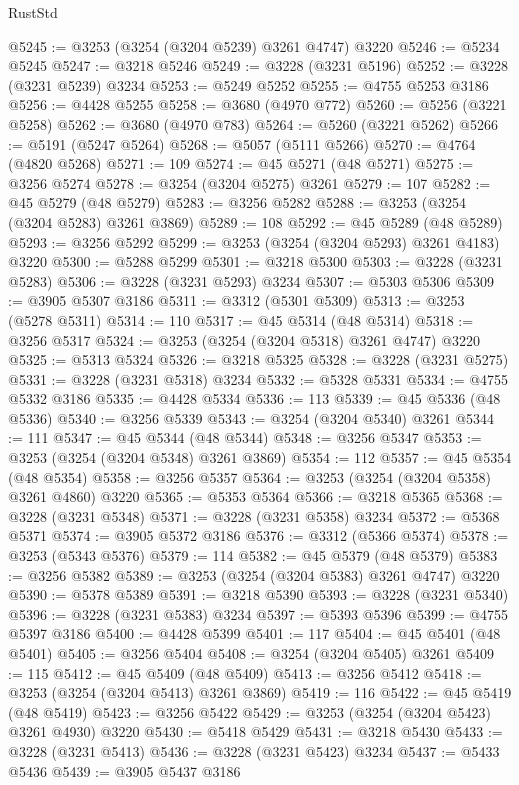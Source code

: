 \begin{lexlean}{RustStd}
\begin{coremodule}
{\begin{coremodule}
{{{{{{{{{{{{{{{{{{{{{{{{{{{{{{{{{{{{{@5245 := @3253 (@3254 (@3204 @5239) @3261 @4747) @3220
@5246 := @5234 @5245
@5247 := @3218 @5246
@5249 := @3228 (@3231 @5196)
@5252 := @3228 (@3231 @5239) @3234
@5253 := @5249 @5252
@5255 := @4755 @5253 @3186
@5256 := @4428 @5255
@5258 := @3680 (@4970 @772)
@5260 := @5256 (@3221 @5258)
@5262 := @3680 (@4970 @783)
@5264 := @5260 (@3221 @5262)
@5266 := @5191 (@5247 @5264)
@5268 := @5057 (@5111 @5266)
@5270 := @4764 (@4820 @5268)
@5271 := 109
@5274 := @45 @5271 (@48 @5271)
@5275 := @3256 @5274
@5278 := @3254 (@3204 @5275) @3261
@5279 := 107
@5282 := @45 @5279 (@48 @5279)
@5283 := @3256 @5282
@5288 := @3253 (@3254 (@3204 @5283) @3261 @3869)
@5289 := 108
@5292 := @45 @5289 (@48 @5289)
@5293 := @3256 @5292
@5299 := @3253 (@3254 (@3204 @5293) @3261 @4183) @3220
@5300 := @5288 @5299
@5301 := @3218 @5300
@5303 := @3228 (@3231 @5283)
@5306 := @3228 (@3231 @5293) @3234
@5307 := @5303 @5306
@5309 := @3905 @5307 @3186
@5311 := @3312 (@5301 @5309)
@5313 := @3253 (@5278 @5311)
@5314 := 110
@5317 := @45 @5314 (@48 @5314)
@5318 := @3256 @5317
@5324 := @3253 (@3254 (@3204 @5318) @3261 @4747) @3220
@5325 := @5313 @5324
@5326 := @3218 @5325
@5328 := @3228 (@3231 @5275)
@5331 := @3228 (@3231 @5318) @3234
@5332 := @5328 @5331
@5334 := @4755 @5332 @3186
@5335 := @4428 @5334
@5336 := 113
@5339 := @45 @5336 (@48 @5336)
@5340 := @3256 @5339
@5343 := @3254 (@3204 @5340) @3261
@5344 := 111
@5347 := @45 @5344 (@48 @5344)
@5348 := @3256 @5347
@5353 := @3253 (@3254 (@3204 @5348) @3261 @3869)
@5354 := 112
@5357 := @45 @5354 (@48 @5354)
@5358 := @3256 @5357
@5364 := @3253 (@3254 (@3204 @5358) @3261 @4860) @3220
@5365 := @5353 @5364
@5366 := @3218 @5365
@5368 := @3228 (@3231 @5348)
@5371 := @3228 (@3231 @5358) @3234
@5372 := @5368 @5371
@5374 := @3905 @5372 @3186
@5376 := @3312 (@5366 @5374)
@5378 := @3253 (@5343 @5376)
@5379 := 114
@5382 := @45 @5379 (@48 @5379)
@5383 := @3256 @5382
@5389 := @3253 (@3254 (@3204 @5383) @3261 @4747) @3220
@5390 := @5378 @5389
@5391 := @3218 @5390
@5393 := @3228 (@3231 @5340)
@5396 := @3228 (@3231 @5383) @3234
@5397 := @5393 @5396
@5399 := @4755 @5397 @3186
@5400 := @4428 @5399
@5401 := 117
@5404 := @45 @5401 (@48 @5401)
@5405 := @3256 @5404
@5408 := @3254 (@3204 @5405) @3261
@5409 := 115
@5412 := @45 @5409 (@48 @5409)
@5413 := @3256 @5412
@5418 := @3253 (@3254 (@3204 @5413) @3261 @3869)
@5419 := 116
@5422 := @45 @5419 (@48 @5419)
@5423 := @3256 @5422
@5429 := @3253 (@3254 (@3204 @5423) @3261 @4930) @3220
@5430 := @5418 @5429
@5431 := @3218 @5430
@5433 := @3228 (@3231 @5413)
@5436 := @3228 (@3231 @5423) @3234
@5437 := @5433 @5436
@5439 := @3905 @5437 @3186
}}}}}}}}}}}}}}}}}}}}}}}}}}}}}}}}}}}}}
\end{coremodule}}
\end{coremodule}
\end{lexlean}
